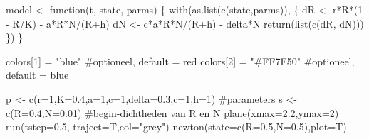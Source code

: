 \documentclass[
  a4paper,
]{scrbook}
\newenvironment{Shaded}{\begin{snugshade}}{\end{snugshade}}
\newcommand{\AttributeTok}[1]{\textcolor[rgb]{0.40,0.45,0.13}{#1}}
\newcommand{\CommentTok}[1]{\textcolor[rgb]{0.37,0.37,0.37}{#1}}
\newcommand{\ControlFlowTok}[1]{\textcolor[rgb]{0.00,0.23,0.31}{#1}}
\newcommand{\DecValTok}[1]{\textcolor[rgb]{0.68,0.00,0.00}{#1}}
\newcommand{\FloatTok}[1]{\textcolor[rgb]{0.68,0.00,0.00}{#1}}
\newcommand{\FunctionTok}[1]{\textcolor[rgb]{0.28,0.35,0.67}{#1}}
\newcommand{\NormalTok}[1]{\textcolor[rgb]{0.00,0.23,0.31}{#1}}
\newcommand{\OtherTok}[1]{\textcolor[rgb]{0.00,0.23,0.31}{#1}}
\newcommand{\SpecialCharTok}[1]{\textcolor[rgb]{0.37,0.37,0.37}{#1}}
\newcommand{\StringTok}[1]{\textcolor[rgb]{0.13,0.47,0.30}{#1}}
\theoremstyle{definition}
\theoremstyle{remark}
\begin{document}
\begin{Shaded}
\begin{Highlighting}[]
\NormalTok{model }\OtherTok{\textless{}{-}} \ControlFlowTok{function}\NormalTok{(t, state, parms) \{}
  \FunctionTok{with}\NormalTok{(}\FunctionTok{as.list}\NormalTok{(}\FunctionTok{c}\NormalTok{(state,parms)), \{}
\NormalTok{    dR }\OtherTok{\textless{}{-}}\NormalTok{ r}\SpecialCharTok{*}\NormalTok{R}\SpecialCharTok{*}\NormalTok{(}\DecValTok{1} \SpecialCharTok{{-}}\NormalTok{ R}\SpecialCharTok{/}\NormalTok{K) }\SpecialCharTok{{-}}\NormalTok{ a}\SpecialCharTok{*}\NormalTok{R}\SpecialCharTok{*}\NormalTok{N}\SpecialCharTok{/}\NormalTok{(R}\SpecialCharTok{+}\NormalTok{h)}
\NormalTok{    dN }\OtherTok{\textless{}{-}}\NormalTok{ c}\SpecialCharTok{*}\NormalTok{a}\SpecialCharTok{*}\NormalTok{R}\SpecialCharTok{*}\NormalTok{N}\SpecialCharTok{/}\NormalTok{(R}\SpecialCharTok{+}\NormalTok{h) }\SpecialCharTok{{-}}\NormalTok{ delta}\SpecialCharTok{*}\NormalTok{N}
    \FunctionTok{return}\NormalTok{(}\FunctionTok{list}\NormalTok{(}\FunctionTok{c}\NormalTok{(dR, dN)))  }
\NormalTok{  \}) }
\NormalTok{\}  }

\NormalTok{colors[}\DecValTok{1}\NormalTok{] }\OtherTok{=} \StringTok{"blue"} \CommentTok{\#optioneel, default = \textquotesingle{}red\textquotesingle{}}
\NormalTok{colors[}\DecValTok{2}\NormalTok{] }\OtherTok{=} \StringTok{"\#FF7F50"} \CommentTok{\#optioneel, default = \textquotesingle{}blue\textquotesingle{}}

\NormalTok{p }\OtherTok{\textless{}{-}} \FunctionTok{c}\NormalTok{(}\AttributeTok{r=}\DecValTok{1}\NormalTok{,}\AttributeTok{K=}\FloatTok{0.4}\NormalTok{,}\AttributeTok{a=}\DecValTok{1}\NormalTok{,}\AttributeTok{c=}\DecValTok{1}\NormalTok{,}\AttributeTok{delta=}\FloatTok{0.3}\NormalTok{,}\AttributeTok{c=}\DecValTok{1}\NormalTok{,}\AttributeTok{h=}\DecValTok{1}\NormalTok{)  }\CommentTok{\#parameters}
\NormalTok{s }\OtherTok{\textless{}{-}} \FunctionTok{c}\NormalTok{(}\AttributeTok{R=}\FloatTok{0.4}\NormalTok{,}\AttributeTok{N=}\FloatTok{0.01}\NormalTok{) }\CommentTok{\#begin{-}dichtheden van R en N  }
\FunctionTok{plane}\NormalTok{(}\AttributeTok{xmax=}\FloatTok{2.2}\NormalTok{,}\AttributeTok{ymax=}\DecValTok{2}\NormalTok{)}
\FunctionTok{run}\NormalTok{(}\AttributeTok{tstep=}\FloatTok{0.5}\NormalTok{, }\AttributeTok{traject=}\NormalTok{T,}\AttributeTok{col=}\StringTok{"grey"}\NormalTok{)}
\FunctionTok{newton}\NormalTok{(}\AttributeTok{state=}\FunctionTok{c}\NormalTok{(}\AttributeTok{R=}\FloatTok{0.5}\NormalTok{,}\AttributeTok{N=}\FloatTok{0.5}\NormalTok{),}\AttributeTok{plot=}\NormalTok{T)}


\end{Highlighting}
\end{Shaded}
\end{document}
